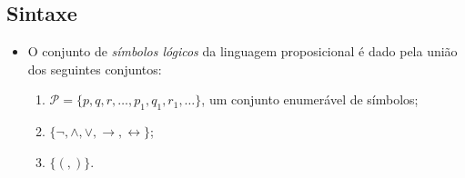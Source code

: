     \subsection{Sintaxe}
        
        \begin{itemize}[left=0.5cm, align=left, nosep]
            \item O conjunto de \textit{símbolos lógicos} da linguagem proposicional é dado pela união dos seguintes conjuntos:
            \begin{enumerate}[label=\arabic*., left=0.5cm, align=left, nosep]
                \item $\mathcal{P} = \{p, q, r, \ldots, p_1, q_1, r_1, \ldots\}$, um conjunto enumerável de símbolos;
                \item $\{\neg, \land, \lor, \rightarrow, \leftrightarrow\}$;
                \item $\{(, )\}$.
            \end{enumerate}


\end{itemize}

